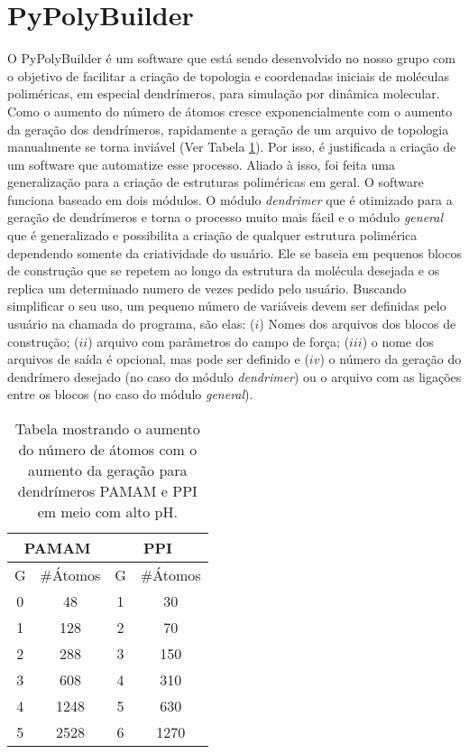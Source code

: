 \section{PyPolyBuilder}\label{PyPolyBuilder}
O PyPolyBuilder é um software que está sendo desenvolvido no nosso grupo com o objetivo de facilitar a criação de topologia e coordenadas iniciais de moléculas poliméricas, em especial dendrímeros, para simulação por dinâmica molecular.
Como o aumento do número de átomos cresce exponencialmente com o aumento da geração dos dendrímeros, rapidamente a geração de um arquivo de topologia manualmente se torna inviável (Ver Tabela \ref{tab:pypolybuilder}).
Por isso, é justificada a criação de um software que automatize esse processo.
Aliado à isso, foi feita uma generalização para a criação de estruturas poliméricas em geral.
O software funciona baseado em dois módulos.
O módulo \textit{dendrimer} que é otimizado para a geração de dendrímeros e torna o processo muito mais fácil e o módulo \textit{general} que é generalizado e possibilita a criação de qualquer estrutura polimérica dependendo somente da criatividade do usuário.
Ele se baseia em pequenos blocos de construção que se repetem ao longo da estrutura da molécula desejada e os replica um determinado numero de vezes pedido pelo usuário.
Buscando simplificar o seu uso, um pequeno número de variáveis devem ser definidas pelo usuário na chamada do programa, são elas:
($i$) Nomes dos arquivos dos blocos de construção;
($ii$) arquivo com parâmetros do campo de força;
($iii$) o nome dos arquivos de saída é opcional, mas pode ser definido e
($iv$) o número da geração do dendrímero desejado (no caso do módulo \textit{dendrimer}) ou o arquivo com as ligações entre os blocos (no caso do módulo \textit{general}).

\begin{table}[ht!]
\centering
\caption{Tabela mostrando o aumento do número de átomos com o aumento da geração para dendrímeros PAMAM e PPI em meio com alto pH.}
\begin{tabular}{cc|cc}
\hline
\multicolumn{2}{c|}{PAMAM}   & \multicolumn{2}{c}{PPI} \\
\hline
G & \#Átomos& G & \#Átomos \\
\hline
0 & 48      & 1 &   30\\
1 & 128     & 2 &   70\\
2 & 288     & 3 &   150\\
3 & 608     & 4 &   310\\
4 & 1248    & 5 &   630\\
5 & 2528    & 6 &   1270\\
\hline
\end{tabular}
\label{tab:pypolybuilder}
\end{table}

